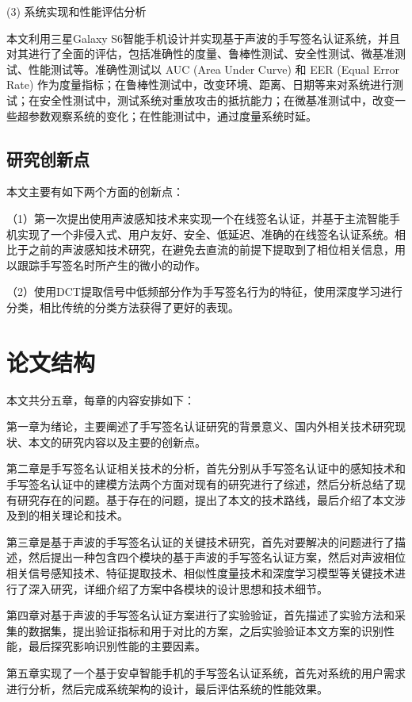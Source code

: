 (3) 系统实现和性能评估分析

本文利用三星Galaxy S6智能手机设计并实现基于声波的手写签名认证系统，并且对其进行了全面的评估，包括准确性的度量、鲁棒性测试、安全性测试、微基准测试、性能测试等。准确性测试以 AUC (Area Under Curve) 和 EER (Equal Error Rate) 作为度量指标；在鲁棒性测试中，改变环境、距离、日期等来对系统进行测试；在安全性测试中，测试系统对重放攻击的抵抗能力；在微基准测试中，改变一些超参数观察系统的变化；在性能测试中，通过度量系统时延。


\subsection{研究创新点}

本文主要有如下两个方面的创新点：

（1）第一次提出使用声波感知技术来实现一个在线签名认证，并基于主流智能手机实现了一个非侵入式、用户友好、安全、低延迟、准确的在线签名认证系统。相比于之前的声波感知技术研究，在避免去直流的前提下提取到了相位相关信息，用以跟踪手写签名时所产生的微小的动作。

（2）使用DCT提取信号中低频部分作为手写签名行为的特征，使用深度学习进行分类，相比传统的分类方法获得了更好的表现。

\section{论文结构}

本文共分五章，每章的内容安排如下：

第一章为绪论，主要阐述了手写签名认证研究的背景意义、国内外相关技术研究现状、本文的研究内容以及主要的创新点。

第二章是手写签名认证相关技术的分析，首先分别从手写签名认证中的感知技术和手写签名认证中的建模方法两个方面对现有的研究进行了综述，然后分析总结了现有研究存在的问题。基于存在的问题，提出了本文的技术路线，最后介绍了本文涉及到的相关理论和技术。

第三章是基于声波的手写签名认证的关键技术研究，首先对要解决的问题进行了描述，然后提出一种包含四个模块的基于声波的手写签名认证方案，然后对声波相位相关信号感知技术、特征提取技术、相似性度量技术和深度学习模型等关键技术进行了深入研究，详细介绍了方案中各模块的设计思想和技术细节。

第四章对基于声波的手写签名认证方案进行了实验验证，首先描述了实验方法和采集的数据集，提出验证指标和用于对比的方案，之后实验验证本文方案的识别性能，最后探究影响识别性能的主要因素。

第五章实现了一个基于安卓智能手机的手写签名认证系统，首先对系统的用户需求进行分析，然后完成系统架构的设计，最后评估系统的性能效果。

